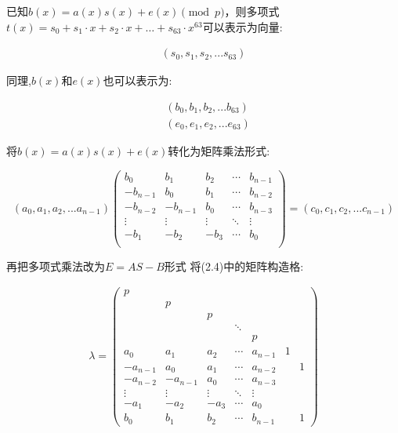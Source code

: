 \documentclass[12pt,a4paper]{article}
\numberwithin{equation}{section}
\begin{document}
已知$b(x)=a(x)s(x)+e(x) \pmod p$，则多项式$t(x)=s_0+s_1 \cdot x + s_2 \cdot x + \ldots + s_{63} \cdot x^{63}$可以表示为向量:

\begin{align}
	(s_0,s_1,s_2,...s_{63})
\end{align}

同理,$b(x)$和$e(x)$也可以表示为:

\begin{align}
	 & (b_0,b_1,b_2,...b_{63}) \\
	 & (e_0,e_1,e_2,...e_{63})
\end{align}

将$b(x)=a(x)s(x)+e(x)$转化为矩阵乘法形式:

\begin{equation}
	(a_0,a_1,a_2,...a_{n-1})
	\left(
	\begin{smallmatrix}
			b_0      & b_1      & b_2    & \cdots & b_{n-1} \\
			-b_{n-1} & b_0      & b_1    & \cdots & b_{n-2} \\
			-b_{n-2} & -b_{n-1} & b_0    & \cdots & b_{n-3} \\
			\vdots   & \vdots   & \vdots & \ddots & \vdots  \\
			-b_1     & -b_2     & -b_3   & \cdots & b_0     \\
		\end{smallmatrix}
	\right)
	=
	(c_0,c_1,c_2,...c_{n-1})
\end{equation}

再把多项式乘法改为$E=AS-B$形式
将(2.4)中的矩阵构造格:

\begin{align}
	\lambda=
	\left(
	\begin{smallmatrix}
		p        &          &        &        &         &   &   \\
		& p        &        &        &         &   &   \\
		&          & p      &        &         &   &   \\
		&          &        & \ddots &         &   &   \\
		&          &        &        & p       &   &   \\
		a_0      & a_1      & a_2    & \cdots & a_{n-1} & 1 &   \\
		-a_{n-1} & a_0      & a_1    & \cdots & a_{n-2} &   & 1 \\
		-a_{n-2} & -a_{n-1} & a_0    & \cdots & a_{n-3} &   &   \\
		\vdots   & \vdots   & \vdots & \ddots & \vdots  &   &   \\
		-a_1     & -a_2     & -a_3   & \cdots & a_0     &   &   \\
		b_0      & b_1      & b_2    & \cdots & b_{n-1} &   & 1
	\end{smallmatrix}
	\right)
\end{align}
\end{document}
